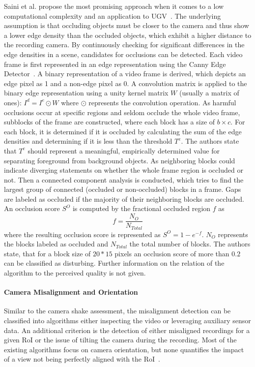 Saini et al. propose the most promising approach when it comes to a low computational complexity and an application to \ac{UGV}~\cite{Saini2012}.
The underlying assumption is that occluding objects must be closer to the camera and thus show a lower edge density than the occluded objects, which exhibit a higher distance to the recording camera.
By continuously checking for significant differences in the edge densities in a scene, candidates for occlusions can be detected.
Each video frame is first represented in an edge representation using the Canny Edge Detector~\cite{Canny1986}.
A binary representation of a video frame is derived, which depicts an edge pixel as 1 and a non-edge pixel as 0.
A convolution matrix is applied to the binary edge representation using a unity kernel matrix $W$  (usually a matrix of ones): $I^d = I^e \odot W$ where $\odot$ represents the convolution operation.
As harmful occlusions occur at specific regions and seldom occlude the whole video frame, subblocks of the frame are constructed, where each block has a size  of $b \times c$. 
For each block, it is determined if it is occluded by calculating the sum of the edge densities and determining if it is less than the threshold $T^e$.
The authors state that $T^e$ should represent a meaningful, empirically determined value for separating foreground from background objects.
As neighboring blocks could indicate diverging statements on whether the whole frame region is occluded or not.
Then a connected component analysis is conducted, which tries to find the largest group of connected (occluded or non-occluded) blocks in a frame. 
Gaps are labeled as occluded if the majority of their neighboring blocks are occluded.
An occlusion score $S^O$ is computed by the fractional occluded region $f$ as
\begin{equation} 
f = \frac{N_{O}}{N_{Total}}
\end{equation}
where the resulting occlusion score is represented as $S^O = 1 - e^{-f}$. 
$N_{O}$ represents the blocks labeled as occluded and $N_{Total}$ the total number of blocks. 
The authors state, that for a block size of $20 * 15$ pixels an occlusion score of  more than $0.2$ can be classified as disturbing. Further information on the relation of the algorithm to the perceived quality is not given.
\paragraph{Camera Misalignment and Orientation}
Similar to the camera shake assessment, the misalignment detection can be classified into algorithms either inspecting the video or leveraging auxiliary sensor data.
An additional criterion is the detection of either misaligned recordings for a given \ac{RoI} or the issue of tilting the camera during the recording.
Most of the existing algorithms focus on camera orientation, 
but none quantifies the impact of a view not being perfectly aligned with the \ac{RoI}~\cite{Cricri2014,Saini2012}. 

